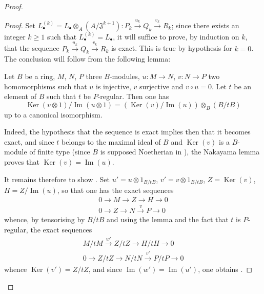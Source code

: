 \begin{proof}
\begin{proof}
Set $L_\bullet^{(k)}=L_\bullet\otimes_A(A/\mathfrak{J}^{k+1}):P_k\xrightarrow{u_k}Q_k\xrightarrow{v_k}R_k$; since there exists an integer $k\geqslant 1$ such that $L_\bullet^{(k)}=L_\bullet$, it will suffice to prove, by induction on $k$, that the sequence $P_k\xrightarrow{u_k}Q_k\xrightarrow{v_k}R_k$ is
exact.
This is true by hypothesis for $k=0$.
The conclusion will follow from the following lemma:

\begin{lemma}[12.3.3.3]
\label{IV.12.3.3.3}
Let $B$ be a ring, $M$, $N$, $P$ three $B$-modules, $u:M\to N$, $v:N\to P$ two homomorphisms such that $u$ is injective, $v$ surjective and $v\circ u=0$.
Let $t$ be an element of $B$ such that $t$ be $P$-regular.
Then one has
\begin{equation}
\label{IV.12.3.3.4b}
\operatorname{Ker}(v\otimes 1)/\operatorname{Im}(u\otimes 1) = (\operatorname{Ker}(v)/\operatorname{Im}(u))\otimes_B(B/tB)
\end{equation}
up to a canonical isomorphism.
\end{lemma}

Indeed, the hypothesis that the sequence  is exact implies then that it becomes exact, and since $t$ belongs to the maximal ideal of $B$ and $\operatorname{Ker}(v)$ is a $B$-module of finite type (since $B$ is supposed Noetherian in ), the Nakayama lemma proves that $\operatorname{Ker}(v)=\operatorname{Im}(u)$.

It remains therefore to show .
Set $u'=u\otimes 1_{B/tB}$, $v'=v\otimes 1_{B/tB}$, $Z=\operatorname{Ker}(v)$, $H=Z/\operatorname{Im}(u)$, so that one has the exact sequences
\begin{gather*}
  0\to M\to Z\to H\to 0\\
  0\to Z\to N\xrightarrow{v} P\to 0
\end{gather*}
whence, by tensorising by $B/tB$ and using the lemma  and the fact that $t$ is $P$-regular, the exact sequences
\begin{gather*}
  M/tM\xrightarrow{w'} Z/tZ\to H/tH\to 0\\
  0\to Z/tZ\to N/tN\xrightarrow{v'} P/tP\to 0
\end{gather*}
whence $\operatorname{Ker}(v')=Z/tZ$, and since $\operatorname{Im}(w')=\operatorname{Im}(u')$, one obtains .
\end{proof}
\end{proof}

